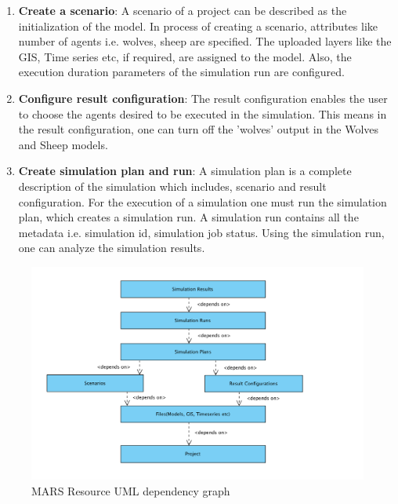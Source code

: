 \begin{enumerate}
            \item 
                \textbf{Create a scenario}: A scenario of a project can be described as the initialization of the model.
                In process of creating a scenario, attributes like number of agents i.e. wolves, sheep are specified. 
                The uploaded layers like the GIS, Time series etc, if required, are assigned to the model. Also,
                the execution duration parameters of the simulation run are configured.

            \item 
                \textbf{Configure result configuration}: The result configuration enables the user to choose
                the agents desired to be executed in the simulation. This means in the result 
                configuration, one can turn off the 'wolves' output in the Wolves and Sheep models.
            \item  
                \textbf{Create simulation plan and run}: A simulation plan is a complete description of the
                 simulation which includes, scenario and result configuration. For the execution of a simulation
                 one must run the simulation plan, which creates
                 a simulation run. A simulation run contains all the metadata i.e. simulation id, simulation 
                 job status. Using the simulation run, one can analyze the 
                 simulation results.
        \end{enumerate} 
        
        \begin{figure}[H]
            \centering \includegraphics[scale=0.6]{grafiken/marsDependency.png}
            \caption{MARS Resource UML dependency graph}
            \label{fig:marsDependency}
        \end{figure}
        

